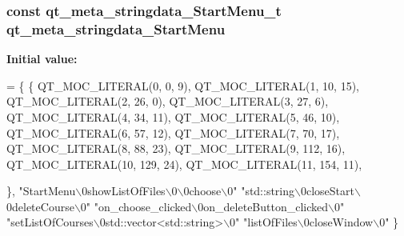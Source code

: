 \subsubsection[{qt\-\_\-meta\-\_\-stringdata\-\_\-\-Start\-Menu}]{\setlength{\rightskip}{0pt plus 5cm}const {\bf qt\-\_\-meta\-\_\-stringdata\-\_\-\-Start\-Menu\-\_\-t} qt\-\_\-meta\-\_\-stringdata\-\_\-\-Start\-Menu\hspace{0.3cm}{\ttfamily [static]}}\label{_release_2moc__startmenu_8cpp_a9cc813e37b599b09cc587d5b88e6e9e5}
{\bfseries Initial value\-:}
\begin{DoxyCode}
= \{
    \{
QT_MOC_LITERAL(0, 0, 9),
QT_MOC_LITERAL(1, 10, 15),
QT_MOC_LITERAL(2, 26, 0),
QT_MOC_LITERAL(3, 27, 6),
QT_MOC_LITERAL(4, 34, 11),
QT_MOC_LITERAL(5, 46, 10),
QT_MOC_LITERAL(6, 57, 12),
QT_MOC_LITERAL(7, 70, 17),
QT_MOC_LITERAL(8, 88, 23),
QT_MOC_LITERAL(9, 112, 16),
QT_MOC_LITERAL(10, 129, 24),
QT_MOC_LITERAL(11, 154, 11),

    \},
    \textcolor{stringliteral}{"StartMenu\(\backslash\)0showListOfFiles\(\backslash\)0\(\backslash\)0choose\(\backslash\)0"}
    \textcolor{stringliteral}{"std::string\(\backslash\)0closeStart\(\backslash\)0deleteCourse\(\backslash\)0"}
    \textcolor{stringliteral}{"on\_choose\_clicked\(\backslash\)0on\_deleteButton\_clicked\(\backslash\)0"}
    \textcolor{stringliteral}{"setListOfCourses\(\backslash\)0std::vector<std::string>\(\backslash\)0"}
    \textcolor{stringliteral}{"listOfFiles\(\backslash\)0closeWindow\(\backslash\)0"}
\}
\end{DoxyCode}
